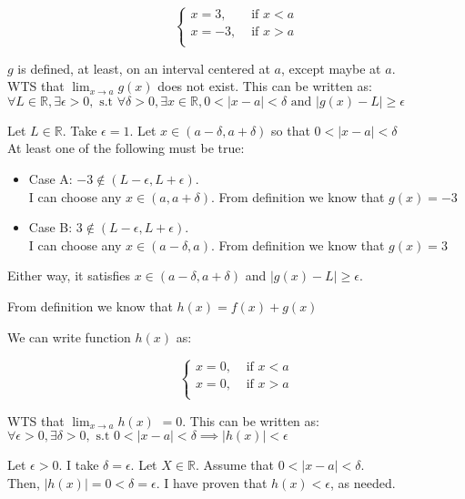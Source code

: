\documentclass[12pt]{exam}
\newcommand {\DS} [1] {${\displaystyle #1}$}
\newcommand{\vv}{\vspace{.2cm}}
\newcommand{\R}{\mathbb{R}}
\begin{document}
\begin{enumerate}
$$
\begin{cases}
	x = 3, &\text{ if }x < a\\
	x = -3, &\text{ if } x > a\\
\end{cases}
$$

$g$ is defined, at least, on an interval centered at $a$, except maybe at $a$.\\

WTS that \DS{\lim_{x \to a} g(x)} does not exist.
This can be written as: $\forall L \in \R, \exists \epsilon > 0, \mbox{ s.t } \forall \delta > 0, \exists x \in \R,
 0 < |x - a| < \delta \mbox{ and } |g(x) - L| \geq \epsilon$

Let $L \in \R$. Take $\epsilon = 1$. Let $x \in (a - \delta, a + \delta)$ so that $0 < |x - a| < \delta$\\
At least one of the following must be true:

\begin{itemize}
	\item Case A: $-3 \notin (L - \epsilon, L + \epsilon).$ \\ 
	I can choose any $x \in (a, a + \delta)$. From definition we know that $g(x) = -3$
\end{itemize}

\begin{itemize}
	\item Case B: $3 \notin (L - \epsilon, L + \epsilon).$ \\ 
	I can choose any $x \in (a - \delta, a )$. From definition we know that $g(x) = 3$
\end{itemize}

Either way, it satisfies $x \in (a - \delta, a + \delta)$ and $|g(x) - L| \geq \epsilon$. \\

\vv

From definition we know that $h(x) = f(x) + g(x)$

We can write function $h(x)$ as:

$$
\begin{cases}
	x = 0, &\text{ if }x < a\\
	x = 0, &\text{ if } x > a\\
\end{cases}
$$

WTS that \DS{\lim_{x \to a} h(x)} $= 0$. This can be written as: $\forall \epsilon > 0, \exists \delta > 0, \mbox{ s.t }
 0 < |x - a| < \delta \implies |h(x)| < \epsilon$
 
Let $\epsilon > 0.$ I take $\delta = \epsilon$. Let $X \in \R$. Assume that $0 < |x - a| < \delta$. \\
Then, $|h(x)| = 0 < \delta = \epsilon.$
I have proven that $h(x) < \epsilon$, as needed.



\end{enumerate}
\end{document}
